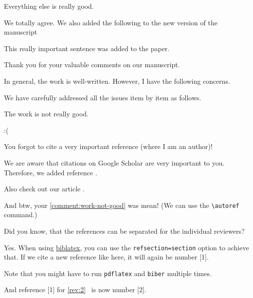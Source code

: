 \documentclass{article}
\begin{document}
\begin{revcomment}
	Everything else is really good.
\end{revcomment}
\begin{revresponse}
	We totally agree. We also added the following to the new version of the manuscript
	\begin{changes}
		This really important sentence was added to the paper.
	\end{changes}
\end{revresponse}

\begin{concludingresponse}[]
	Thank you for your valuable comments on our manuscript. 
\end{concludingresponse}

\reviewer
\label{rev:2}
\begin{generalcomment}
	In general, the work is well-written. However, I have the following concerns.
\end{generalcomment}
\begin{revresponse}
	We have carefully addressed all the issues item by item as follows.
\end{revresponse}

\begin{revcomment}\label{comment:work-not-good}
	The work is not really good.
\end{revcomment}
\begin{revresponse}
	:(
\end{revresponse}

\begin{revcomment}
	You forgot to cite a very important reference (where I am an author)!
\end{revcomment}
\begin{revresponse}
	We are aware that citations on Google Scholar are very important to you.
	Therefore, we added reference \cite{ReviewerReference}.
	
	Also check out our article \cite{Besser2020}.
	
	
	And btw, your \autoref{comment:work-not-good} was mean! (We can use the \verb|\autoref| command.)
\end{revresponse}


\reviewer
\begin{revcomment}
	Did you know, that the references can be separated for the individual reviewers?
\end{revcomment}
\begin{revresponse}
	Yes. When using \href{https://www.ctan.org/pkg/biblatex}{biblatex}, you can use the \texttt{refsection=section} option to achieve that.
	If we cite a new reference like \cite{Besser2021} here, it will again be number [1].
	
	Note that you might have to run \texttt{pdflatex} and \texttt{biber} multiple times.
	
	And reference [1] for \autoref{rev:2}~\cite{ReviewerReference} is now number [2].
	
\end{revresponse}
\end{document}
